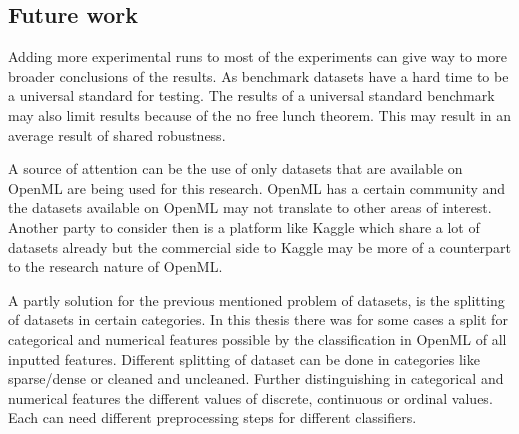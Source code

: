 \documentclass[a4paper,10pt]{article}
\begin{document}




\subsection{Future work}
Adding more experimental runs to most of the experiments can give way to more broader conclusions of the results. As benchmark datasets have a hard time to be a universal standard for testing. The results of a universal standard benchmark may also limit results because of the no free lunch theorem. This may result in an average result of shared robustness.

A source of attention can be the use of only datasets that are available on OpenML are being used for this research. OpenML has a certain community and the datasets available on OpenML may not translate to other areas of interest. Another party to consider then is a platform like Kaggle which share a lot of datasets already but the commercial side to Kaggle may be more of a counterpart to the research nature of OpenML. 

A partly solution for the previous mentioned problem of datasets, is the splitting of datasets in certain categories. In this thesis there was for some cases a split for categorical and numerical features possible by the classification in OpenML of all inputted features. Different splitting of dataset can be done in categories like sparse/dense or cleaned and uncleaned. Further distinguishing in categorical and numerical features the different values of discrete, continuous or ordinal values. Each can need different preprocessing steps for different classifiers. 





\newpage
\end{document}
